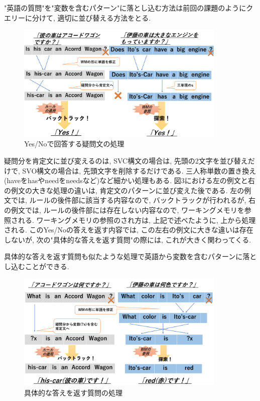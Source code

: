 \documentclass[uplatex,12pt]{jsarticle}
\begin{document}
"英語の質問"を"変数を含むパターン"に落とし込む方法は前回の課題のようにクエリーに分けて, 適切に並び替える方法をとる.

\begin{figure}[htbp]
 \begin{center}
  \includegraphics[width = 10cm, pagebox = cropbox, clip]{images/英文構造_YesNo型.pdf}
 \end{center}
 \caption[]{Yes/Noで回答する疑問文の処理}\label{fig:fig1.1}
\end{figure}

疑問分を肯定文に並び変えるのは, SVC構文の場合は, 先頭の2文字を並び替えだけで, SVO構文の場合は, 先頭文字を削除するだけである. 三人称単数の置き換え(haveをhasやneedをneedsなど)など細かい処理もある. 図3における左の例文と右の例文の大きな処理の違いは, 肯定文のパターンに並び変えた後である. 左の例文では, ルールの後件部に該当する内容なので, バックトラックが行われるが, 右の例文では, ルールの後件部には存在しない内容なので, ワーキングメモリを参照される. ワーキングメモリの参照のされ方は, 上記で述べたように, 上から処理される. このYes/Noの答えを返す内容では, この左右の例文に大きな違いは存在しないが, 次の"具体的な答えを返す質問"の際には, これが大きく関わってくる.


具体的な答えを返す質問も似たような処理で英語から変数を含むパターンに落とし込むことができる. 
\begin{figure}[htbp]
 \begin{center}
  \includegraphics[width = 10cm, pagebox = cropbox, clip]{images/英文構造_疑問詞SVO.pdf}
 \end{center}
 \caption[]{具体的な答えを返す質問の処理}\label{fig:fig1.1}
\end{figure}
\end{document}

